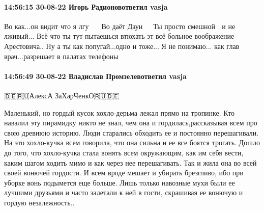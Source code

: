  
 
 
 
 

\paragraph{14:56:15 30-08-22 Игорь Радионовответил vasja}
Во как...он видит что я лгу 🤣🤣🤣🤣
Во даёт Даун 🤣🤣🤣
Ты просто смешной 🤣 и не лживый...
Всё что ты тут пытаешься втюхать эт всё больное воображение Арестовича..
Ну а ты как попугай...одно и тоже...
Я не понимаю... как глав врач...разрешает в палатах телефоны 🤣🤣🤣🤣

\paragraph{14:56:49 30-08-22 Владислав Промзелевответил vasja}

🇩🇪🇷🇺АлексА ЗаХарЧенкО🇷🇺🇩🇪

Маленький, но гордый кусок хохло-дерьма лежал прямо на тропинке. Кто навалил
эту пирамидку никто не знал, чем она и гордилась,рассказывая всем про свою
древнюю историю. Люди старались обходить ее и постоянно перешагивали. На это
хохло-кучка всем говорила, что она сильна и ее все боятся трогать. Дошло до
того, что хохло-кучка стала вонять всем окружающим, как им себя вести, каким
шагом ходить мимо и как через нее перешагивать. Так и жила она во всей своей
вонючей гордости. И всем вроде мешает и убирать брезгливо, ибо при уборке вонь
подымется еще больше. Лишь только навозные мухи были ее лучшими друзьями и
часто залетали к ней в гости, скрашивая ее вонючую и гордую незалежность..
